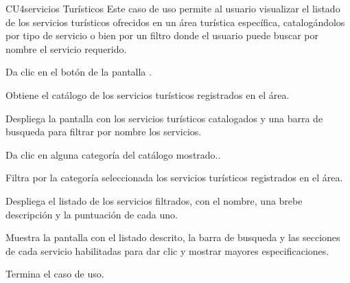 
% 



	\begin{UseCase}{CU4}{servicios Turísticos}{
		Este caso de uso permite al usuario visualizar el listado de los servicios turísticos ofrecidos en un área turística específica, catalogándolos por tipo de servicio o bien por un filtro donde el usuario puede buscar por nombre el servicio requerido. 
	}
	\end{UseCase}
	\begin{UCtrayectoria} 
		\UCpaso[\UCactor] Da clic en el botón  de la pantalla .
		
		\UCpaso Obtiene el catálogo de los servicios turísticos registrados en el área.
		
		\UCpaso Despliega la pantalla  con los servicios turísticos catalogados y una barra de busqueda para filtrar por nombre los servicios.
		
		\UCpaso[\UCactor] Da clic en alguna categoría del catálogo mostrado..
		
		\UCpaso  Filtra por la categoría seleccionada los servicios turísticos registrados en el área.
		
		\UCpaso Despliega el listado de los servicios filtrados, con el nombre, una brebe descripción y la puntuación de cada uno.\label{CU4-Servicios}
		
		\UCpaso Muestra la pantalla  con el listado descrito, la barra de busqueda y las secciones de cada servicio habilitadas para dar clic y mostrar mayores especificaciones.
		
		\UCpaso[] Termina el caso de uso.
		
	\end{UCtrayectoria}

